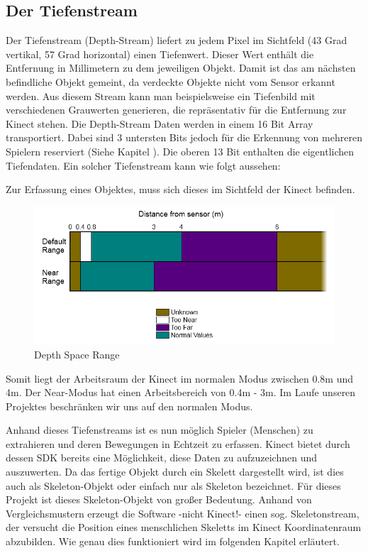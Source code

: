 \subsection{Der Tiefenstream}
Der Tiefenstream (Depth-Stream) liefert zu jedem Pixel im Sichtfeld (43 Grad vertikal, 57 Grad horizontal) einen Tiefenwert. Dieser Wert enthält die Entfernung in Millimetern zu dem jeweiligen Objekt.
Damit ist das am nächsten befindliche Objekt gemeint, da verdeckte Objekte nicht vom Sensor erkannt werden.
Aus diesem Stream kann man beispielsweise ein Tiefenbild mit verschiedenen Grauwerten generieren, die repräsentativ für die Entfernung zur Kinect stehen. Die Depth-Stream Daten werden in einem 16 Bit Array transportiert. Dabei sind 3 untersten Bits jedoch für die Erkennung von mehreren Spielern reserviert
(Siehe Kapitel ). Die oberen 13 Bit enthalten die eigentlichen Tiefendaten. Ein solcher Tiefenstream kann wie folgt aussehen:



Zur Erfassung eines Objektes, muss sich dieses im Sichtfeld der Kinect befinden. 
\begin{figure}[H]						
	\centering							
	\includegraphics[scale=0.7]{Bilder/kinect_range.png}			
	\caption{Depth Space Range \cite{ws:microsoft_coordinateSpaces}}						
	\label{f:kinect_range}						
\end{figure}

Somit liegt der Arbeitsraum der Kinect im normalen Modus zwischen 0.8m und 4m. Der Near-Modus hat einen Arbeitsbereich von 0.4m - 3m. Im Laufe unseren Projektes beschränken wir uns auf den normalen Modus.

Anhand dieses Tiefenstreams ist es nun möglich Spieler (Menschen) zu extrahieren und deren Bewegungen
in Echtzeit zu erfassen. Kinect bietet durch dessen SDK bereits eine Möglichkeit, diese Daten zu
aufzuzeichnen und auszuwerten. Da das fertige Objekt durch ein Skelett dargestellt wird, ist dies auch als Skeleton-Objekt oder einfach nur als Skeleton bezeichnet. Für dieses Projekt ist dieses Skeleton-Objekt von großer Bedeutung. Anhand von Vergleichsmustern erzeugt die Software -nicht Kinect!- einen sog. Skeletonstream, der versucht die Position eines menschlichen Skeletts im Kinect Koordinatenraum abzubilden.\cite{SWB-376536934}
Wie genau dies funktioniert wird im folgenden Kapitel erläutert.



